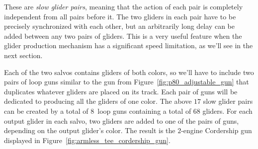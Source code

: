 %
%
%
%

These are \emph{slow glider pairs}, meaning that the action of each pair is completely independent from all pairs before it. The two gliders in each pair have to be precisely synchronized with each other, but an arbitrarily long delay can be added between any two pairs of gliders. This is a very useful feature when the glider production mechanism has a significant speed limitation, as we'll see in the next section.

Each of the two salvos contains gliders of both colors, so we'll have to include two pairs of loop guns  similar to the gun from Figure~\ref{fig:p80_adjustable_gun} that duplicates whatever gliders are placed on its track. Each pair of guns will be dedicated to producing all the gliders of one color. The above $17$ slow glider pairs can be created by a total of $8$~loop guns containing a total of $68$ gliders. For each output glider in each salvo, two gliders are added to one of the pairs of guns, depending on the output glider's color.  The result is the $2$-engine Cordership gun displayed in Figure~\ref{fig:armless_tee_cordership_gun}.

